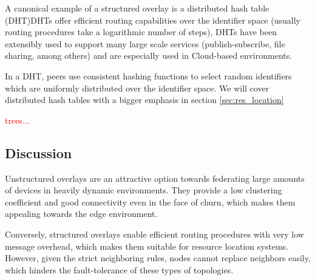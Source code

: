 A canonical example of a structured overlay is a distributed hash table (DHT)DHTs offer efficient routing capabilities over the identifier space (usually routing procedures take a logarithmic number of steps), DHTs have been extensibly used to support many large scale services (publish-subscribe, file sharing, among others) and are especially used in Cloud-based environments. 

In a DHT, peers use consistent hashing functions to select random identifiers which are uniformly distributed over the identifier space. We will cover distributed hash tables with a bigger emphasis in section \ref{sec:res_location}

\textcolor{red}{trees...}

\subsection{Discussion}

Unstructured overlays are an attractive option towards federating large amounts of devices in heavily dynamic environments. They provide a low clustering coefficient and good connectivity even in the face of churn, which makes them appealing towards the edge environment. 

Conversely, structured overlays enable efficient routing procedures with very low message overhead, which makes them suitable for resource location systems. However, given the strict neighboring rules, nodes cannot replace neighbors easily, which hinders the fault-tolerance of these types of topologies.